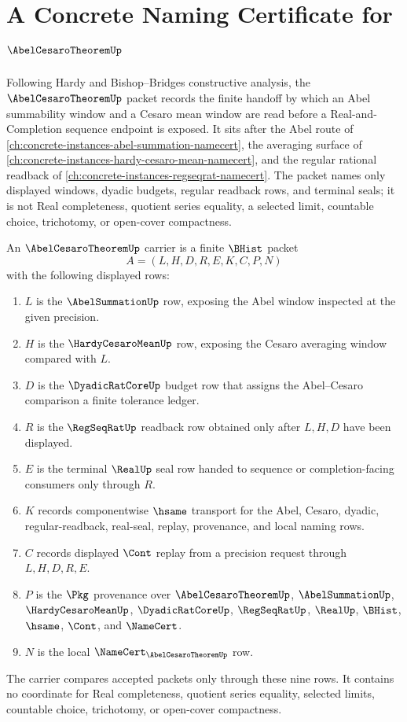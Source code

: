 \chapter{A Concrete Naming Certificate for $\AbelCesaroTheoremUp$}
\label{ch:concrete-instances-abel-cesaro-theorem-namecert}

Following Hardy and Bishop--Bridges constructive analysis, the $\AbelCesaroTheoremUp$ packet records the finite handoff by which an Abel summability window and a Cesaro mean window are read before a Real-and-Completion sequence endpoint is exposed. It sits after the Abel route of \autoref{ch:concrete-instances-abel-summation-namecert}, the averaging surface of \autoref{ch:concrete-instances-hardy-cesaro-mean-namecert}, and the regular rational readback of \autoref{ch:concrete-instances-regseqrat-namecert}. The packet names only displayed windows, dyadic budgets, regular readback rows, and terminal seals; it is not Real completeness, quotient series equality, a selected limit, countable choice, trichotomy, or open-cover compactness.

\begin{definition}
\label{def:abel-cesaro-theorem-carrier}
An $\AbelCesaroTheoremUp$ carrier is a finite $\BHist$ packet
$$
A=(L,H,D,R,E,K,C,P,N)
$$
with the following displayed rows:
\begin{enumerate}
\item $L$ is the $\AbelSummationUp$ row, exposing the Abel window inspected at the given precision.
\item $H$ is the $\HardyCesaroMeanUp$ row, exposing the Cesaro averaging window compared with $L$.
\item $D$ is the $\DyadicRatCoreUp$ budget row that assigns the Abel--Cesaro comparison a finite tolerance ledger.
\item $R$ is the $\RegSeqRatUp$ readback row obtained only after $L,H,D$ have been displayed.
\item $E$ is the terminal $\RealUp$ seal row handed to sequence or completion-facing consumers only through $R$.
\item $K$ records componentwise $\hsame$ transport for the Abel, Cesaro, dyadic, regular-readback, real-seal, replay, provenance, and local naming rows.
\item $C$ records displayed $\Cont$ replay from a precision request through $L,H,D,R,E$.
\item $P$ is the $\Pkg$ provenance over $\AbelCesaroTheoremUp$, $\AbelSummationUp$, $\HardyCesaroMeanUp$, $\DyadicRatCoreUp$, $\RegSeqRatUp$, $\RealUp$, $\BHist$, $\hsame$, $\Cont$, and $\NameCert$.
\item $N$ is the local $\NameCert_{\AbelCesaroTheoremUp}$ row.
\end{enumerate}
The carrier compares accepted packets only through these nine rows. It contains no coordinate for Real completeness, quotient series equality, selected limits, countable choice, trichotomy, or open-cover compactness.
\end{definition}

